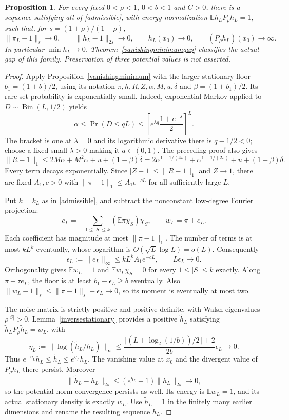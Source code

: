 \documentclass[11pt]{article}
\newcommand{\E}{\mathbb E}
\newtheorem{proposition}[theorem]{Proposition}
\begin{document}
\begin{proposition}\label{exactvanishingminimum}
For every fixed $0<\rho<1$, $0<b<1$ and $C>0$, there is a sequence
satisfying all of \eqref{admissible}, with energy normalization
$\E h_LP_\rho h_L=1$, such that, for $s=(1+\rho)/(1-\rho)$,
\[
 \|\pi_L-1\|_s\to0,\qquad \|h_L-1\|_{2s}\to0,\qquad
 h_L(x_0)\to0,\qquad (P_\rho h_L)(x_0)\to\infty.
\]
In particular $\min h_L\to0$. Theorem~\ref{vanishingminimumgap}
classifies the actual gap of this family. Preservation of three potential
values is not asserted.
\end{proposition}
\begin{proof}
Apply Proposition~\ref{vanishingminimum} with the larger stationary
floor $b_1=(1+b)/2$, using its notation $\pi,h,R,Z,\alpha,M,u,\delta$
and $\beta=(1+b_1)/2$.
Its rare-set probability is exponentially small. Indeed, exponential
Markov applied to $D\sim\operatorname{Bin}(L,1/2)$ yields
\[
 \alpha\leq\Pr(D\leq qL)
 \leq\left[e^{\lambda q}\frac{1+e^{-\lambda}}2\right]^L.
\]
The bracket is one at $\lambda=0$ and its logarithmic derivative there
is $q-1/2<0$; choose a fixed small $\lambda>0$ making it $a\in(0,1)$.
The preceding proof also gives
\[
 \|R-1\|_1\leq2M\alpha+M^2\alpha+u+(1-\beta)\delta
 =2\alpha^{1-1/(4s)}+\alpha^{1-1/(2s)}+u+(1-\beta)\delta.
\]
Every term decays exponentially. Since $|Z-1|\leq\|R-1\|_1$ and
$Z\to1$, there are fixed $A_1,c>0$ with
$\|\pi-1\|_1\leq A_1e^{-cL}$ for all sufficiently large $L$.

Put $k=k_L$ as in \eqref{admissible}, and subtract the nonconstant
low-degree Fourier projection:
\[
 e_L=-\sum_{1\leq|S|\leq k}(\E\pi\chi_S)\chi_S,\qquad
 w_L=\pi+e_L.
\]
Each coefficient has magnitude at most $\|\pi-1\|_1$. The number of
terms is at most $kL^k$ eventually, whose logarithm is
$O(\sqrt L\log L)=o(L)$. Consequently
\[
 \epsilon_L:=\|e_L\|_\infty\leq kL^k A_1e^{-cL},\qquad
 L\epsilon_L\to0.
\]
Orthogonality gives $\E w_L=1$ and $\E w_L\chi_S=0$ for every
$1\leq|S|\leq k$ exactly. Along $\pi+\tau e_L$, the floor is at
least $b_1-\epsilon_L\geq b$ eventually. Also
$\|w_L-1\|_s\leq\|\pi-1\|_s+\epsilon_L\to0$, so its moment
is eventually at most two.

The noise matrix is strictly positive and positive definite, with
Walsh eigenvalues $\rho^{|S|}>0$. Lemma~\ref{inversestationary}
provides a positive $\widetilde h_L$ satisfying
$\widetilde h_L P_\rho\widetilde h_L=w_L$, with
\[
 \eta_L:=\|\log(\widetilde h_L/h_L)\|_\infty
 \leq\frac{\lceil (L+\log_2(1/b))/2\rceil+2}{2b}\epsilon_L\to0.
\]
Thus $e^{-\eta_L}h_L\leq\widetilde h_L\leq e^{\eta_L}h_L$.
The vanishing value at $x_0$ and the divergent value of $P_\rho h_L$
there persist. Moreover
\[
 \|\widetilde h_L-h_L\|_{2s}
 \leq(e^{\eta_L}-1)\|h_L\|_{2s}\to0,
\]
so the potential norm convergence persists as well. Its energy is
$\E w_L=1$, and its actual stationary density is exactly $w_L$.
Use $\widetilde h_L=1$ in the finitely many earlier dimensions and
rename the resulting sequence $h_L$.
\end{proof}
\end{document}
